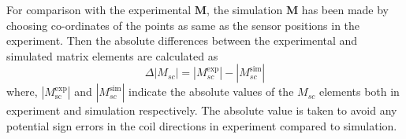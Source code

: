 
For comparison with the experimental $\bm{M}$, the simulation $\bm{M}$
has been made by choosing co-ordinates of the points as same as the
sensor positions in the experiment. Then the absolute differences
between the experimental and simulated matrix elements are calculated
as
\begin{equation}
    \Delta|M_{sc}|=|M_{sc}^{\text{exp}}|-|M_{sc}^{\text{sim}}|
\end{equation}
where, $|M_{\text{sc}}^{\text{exp}}|$ and $|M_{sc}^{\text{sim}}|$
indicate the absolute values of the $M_{sc}$ elements both in
experiment and simulation respectively.  The absolute value is taken
to avoid any potential sign errors in the coil directions in
experiment compared to simulation.





